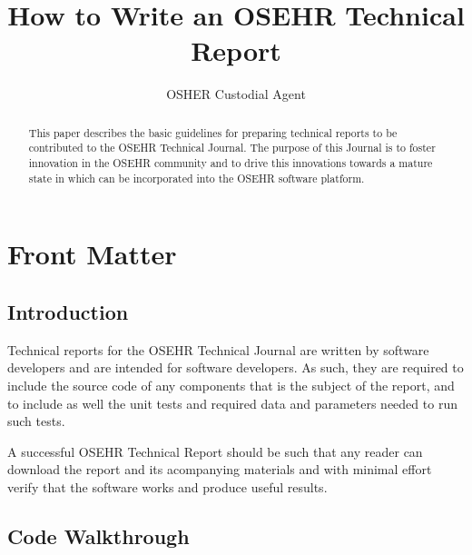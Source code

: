 \documentclass{InsightArticle}
\title{How to Write an OSEHR Technical Report}
\author{OSHER Custodial Agent}
\newcommand{\IJhandlerIDnumber}{3261}
\begin{document}
%
%
\IJhandlefooter{\IJhandlerIDnumber}


\ifpdf
\else
\fi


\maketitle


\ifhtml
\chapter*{Front Matter\label{front}}
\fi


\begin{abstract}
\noindent
This paper describes the basic guidelines for preparing technical
reports to be contributed to the OSEHR Technical Journal. The purpose of this
Journal is to foster innovation in the OSEHR community and to drive this
innovations towards a mature state in which can be incorporated into the OSEHR
software platform.
\end{abstract}

\tableofcontents

\section{Introduction}

Technical reports for the OSEHR Technical Journal are written by software
developers and are intended for software developers. As such, they are required
to include the source code of any components that is the subject of the report,
and to include as well the unit tests and required data and parameters needed
to run such tests.

A successful OSEHR Technical Report should be such that any reader can download
the report and its acompanying materials and with minimal effort verify that the
software works and produce useful results.

\section{Code Walkthrough}
\end{document}
